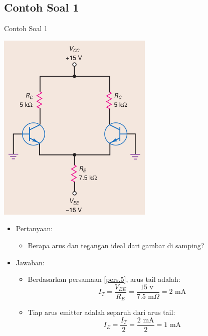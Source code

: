 \documentclass[aspectratio=169]{beamer}
\begin{document}
\subsection{Contoh Soal 1}
\begin{frame}{Contoh Soal 1}
	\begin{multicols}{2}
		\begin{center}
			\includegraphics[width=0.6\textheight]{gambar/01.latihan_soal_1a}
		\end{center}
		\columnbreak
		\begin{itemize}
			\item Pertanyaan:
			\begin{itemize}
				\item Berapa arus dan tegangan ideal dari gambar di samping?
			\end{itemize}
			\item Jawaban:
			\begin{itemize}
				\item Berdasarkan persamaan \ref{pers.5}, arus tail adalah:
				\[I_T = \frac{V_{EE}}{R_E} = \frac{15 \text{ v }}{7.5 \text{ m}\Omega} = 2 \text{ mA} \]
				\item Tiap arus emitter adalah separuh dari arus tail:
				\[ I_E = \frac{I_T}{2} = \frac{2 \text{ mA}}{2} = 1 \text{ mA} \]
			\end{itemize}
		\end{itemize}
		\vfill\null
	\end{multicols}
\end{frame}
\end{document}
